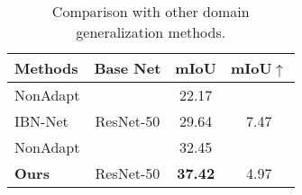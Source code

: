 \documentclass[10pt,twocolumn,letterpaper]{article}
\newcommand{\Gd}{\rowcolor{gray!45}}
\newcommand\Ga{}
\begin{document}
\begin{table}
\centering
\caption{Comparison with other domain generalization methods.}
\vspace{1mm}
\begin{tabular}{l|c|c|c} \toprule
Methods  & Base Net & mIoU & mIoU$\uparrow$ \\ \midrule
\Ga NonAdapt &    & 22.17 &  \\ 
\Ga IBN-Net~\cite{pan2018twoatonce} &\multirow{-2}{*}{ResNet-50} & 29.64 & \multirow{-2}{*}{7.47}\\
\Gd NonAdapt &     & 32.45   & \\ 
\Gd \textbf{Ours}     &   \multirow{-2}{*}{ResNet-50} & \textbf{37.42} & \multirow{-2}{*}{4.97} \\ 

\bottomrule
\end{tabular}
\vspace{-3mm}
\label{tab:compare_generalization}
\end{table}
\end{document}
